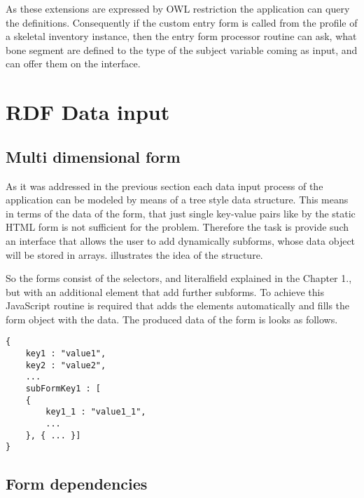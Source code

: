 
As these extensions are expressed by OWL restriction the application can query the definitions. Consequently if the custom entry form is called from the profile of a skeletal inventory instance, then the entry form processor routine can ask, what bone segment are defined to the type of the subject variable coming as input, and can offer them on the interface.



\section{RDF Data input}

\subsection{Multi dimensional form}

As it was addressed in the previous section each data input process of the application can be modeled by means of a tree style data structure. This means in terms of the data of the form, that just single key-value pairs like by the static HTML form is not sufficient for the problem. Therefore the task is provide such an interface that allows the user to add dynamically subforms, whose data object will be stored in arrays.  illustrates the idea of the structure. 


So the forms consist of the selectors, and literalfield explained in the Chapter 1., but with an additional element that add further subforms. To achieve this JavaScript routine is required that adds the elements automatically and fills the form object with the data. The produced data of the form is looks as follows.


\begin{lstlisting}[captionpos=b, caption=JSON object of the form, label=3rd:sparql,
basicstyle=\footnotesize,frame=single]
{
	key1 : "value1",
	key2 : "value2",
	...
	subFormKey1 : [
	{
		key1_1 : "value1_1",
		...				
	}, { ... }]
}
\end{lstlisting}


\subsection{Form dependencies} \label{formDependencies}


